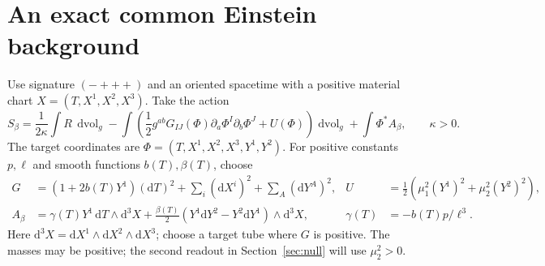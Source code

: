 \documentclass[11pt]{article}
\newcommand{\dd}{\mathrm d}
\newcommand{\vol}{\operatorname{dvol}}
\begin{document}
\section{An exact common Einstein background}\label{sec:family}

Use signature $(-+++)$ and an oriented spacetime with a positive material chart $X=(T,X^1,X^2,X^3)$. Take the action
\begin{equation}\label{eq:action}
 S_\beta=\frac1{2\kappa}\int R\,\vol_g-
 \int\left(\frac12g^{ab}G_{IJ}(\Phi)\partial_a\Phi^I\partial_b\Phi^J+U(\Phi)\right)\vol_g
 +\int\Phi^* A_\beta ,\qquad \kappa>0.
\end{equation}
The target coordinates are $\Phi=(T,X^1,X^2,X^3,Y^1,Y^2)$. For positive constants $p,\ell$ and smooth functions $b(T),\beta(T)$, choose
\begin{align}
 G&=(1+2b(T)Y^1)(\dd T)^2+\sum_i(\dd X^i)^2+\sum_A(\dd Y^A)^2,
 & U&=\tfrac12\left(\mu_1^2(Y^1)^2+\mu_2^2(Y^2)^2\right),\nonumber\\
 A_\beta&=\gamma(T)Y^1\,\dd T\wedge\dd^3X
 +\frac{\beta(T)}2(Y^1\dd Y^2-Y^2\dd Y^1)\wedge\dd^3X,
 &\gamma(T)&=-b(T)p/\ell^3.                                    \label{eq:target}
\end{align}
Here $\dd^3X=\dd X^1\wedge\dd X^2\wedge\dd X^3$; choose a target tube where $G$ is positive. The masses may be positive; the second readout in Section~\ref{sec:null} will use $\mu_2^2>0$.
\end{document}
